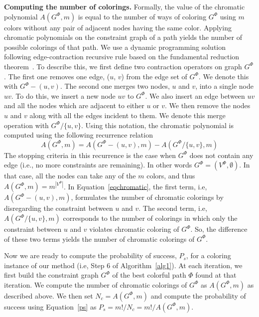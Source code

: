 \documentclass{ws-procs11x85}
\begin{document}
\noindent
{\bf Computing the number of colorings.}
Formally, the value of the chromatic polynomial $A(G^{\Phi}, m)$ is
equal to the number of ways of coloring $G^{\Phi}$ using $m$ colors
without any pair of adjacent nodes having the same color.  Applying
chromatic polynomials on the constraint graph of a path yields the
number of possible colorings of that path.  We use a dynamic
programming solution following edge-contraction recursive rule based
on the fundamental reduction theorem~\cite{dong}.  To describe this,
we first define two contraction operators on graph $G^{\Phi}$. The
first one removes one edge, ($u$, $v$) from the edge set of
$G^{\Phi}$. We denote this with $G^{\Phi} - (u, v)$. The second one
merges two nodes, $u$ and $v$, into a single node $uv$. To do this, we
insert a new node $uv$ to $G^{\Phi}$. We also insert an edge between
$uv$ and all the nodes which are adjacent to either $u$ or $v$. We
then remove the nodes $u$ and $v$ along with all the edges incident to
them. We denote this merge operation with $G^{\Phi} / \{u, v\}$. Using
this notation, the chromatic polynomial is computed using the
following recurrence relation
\begin{equation}
A(G^{\Phi}, m) = A(G^{\Phi}- (u, v), m) - A(G^{\Phi} / \{u, v\}, m)
\label{eqchromatic}
\end{equation}
The stopping criteria in this recurrence is the case when $G^{\Phi}$ does not
contain any edge (i.e., no more constraints are remaining). In other
words $G^{\Phi} = (V^{\Phi}, \emptyset)$. In that case, all the nodes can take any
of the $m$ colors, and thus $A(G^{\Phi}, m) = m^{|V^{\Phi}|}$.  In
Equation~\ref{eqchromatic}, the first term, i.e, $A(G^{\Phi} - (u, v), m)$,
formulates the number of chromatic colorings by disregarding the
constraint between $u$ and $v$. The second term, i.e, $A(G^{\Phi} / \{u, v\},
m)$ corresponds to the number of colorings in which only the
constraint between $u$ and $v$ violates chromatic coloring of $G^{\Phi}$. So,
the difference of these two terms yields the number of chromatic colorings of $G^{\Phi}$.


Now we are ready to compute the probability of success, $P_s$, for a
coloring instance of our method (i.e, Step 6 of Algorithm~\ref{alg1}).
At each iteration, we first build the constraint graph $G^{\Phi}$ of the best
colorful path $\Phi$ found at that iteration. We compute the number of
chromatic colorings of $G^{\Phi}$ as $A(G^{\Phi}, m)$ as described above.  We then
set $N_c = A(G^{\Phi}, m)$ and compute the probability of success using
Equation~\ref{ps} as $P_s = m!/N_c = m!/A(G^{\Phi}, m)$.
\end{document}

